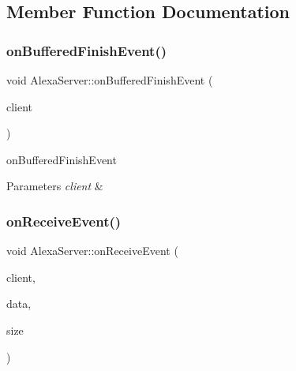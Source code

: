 \subsection{Member Function Documentation}
\mbox{\label{classServer_1_1AlexaServer_a6bb271d518315a17feee8dec73135244}} 
\subsubsection{\texorpdfstring{on\+Buffered\+Finish\+Event()}{onBufferedFinishEvent()}}
{\footnotesize\ttfamily void Alexa\+Server\+::on\+Buffered\+Finish\+Event (\begin{DoxyParamCaption}\item[{\hyperlink{classServer_1_1Client}{Client} $\ast$}]{client }\end{DoxyParamCaption})}



on\+Buffered\+Finish\+Event 


\begin{DoxyParams}{Parameters}
{\em client} & \\
\hline
\end{DoxyParams}
\mbox{\label{classServer_1_1AlexaServer_aba8fd18008128f94c9d9d9c3f510b345}} 
\subsubsection{\texorpdfstring{on\+Receive\+Event()}{onReceiveEvent()}}
{\footnotesize\ttfamily void Alexa\+Server\+::on\+Receive\+Event (\begin{DoxyParamCaption}\item[{\hyperlink{classServer_1_1Client}{Client} $\ast$}]{client,  }\item[{char $\ast$}]{data,  }\item[{size\+\_\+t}]{size }\end{DoxyParamCaption})\hspace{0.3cm}{\ttfamily [virtual]}}



